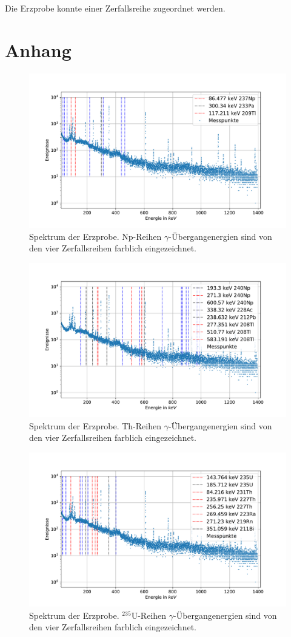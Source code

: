 \documentclass[
	a4paper,
	12pt,
	pagesize,
	ngerman
]{scrartcl}
\begin{document}
	Die Erzprobe konnte einer Zerfallsreihe zugeordnet werden.


	\section{Anhang} \label{s_anhang}

	\begin{figure}[H]
			\includegraphics[width= 0.8 \linewidth]{img/erz_Np}
			\caption{
			Spektrum der Erzprobe. Np-Reihen $\gamma$-Übergangenergien sind von den vier Zerfallsreihen farblich eingezeichnet.
			}
			\label{fg_erz_np}
	\end{figure}
	\begin{figure}[H]
			\includegraphics[width= 0.8 \linewidth]{img/erz_Th}
			\caption{
			Spektrum der Erzprobe. Th-Reihen $\gamma$-Übergangenergien sind von den vier Zerfallsreihen farblich eingezeichnet.
			}
			\label{fg_erz_th}
	\end{figure}
	\begin{figure}[H]
			\includegraphics[width= 0.8 \linewidth]{img/erz_U-Ac}
			\caption{
			Spektrum der Erzprobe. $^{235}$U-Reihen $\gamma$-Übergangenergien sind von den vier Zerfallsreihen farblich eingezeichnet.
			}
			\label{fg_erz_u_ac}
	\end{figure}
\end{document}
